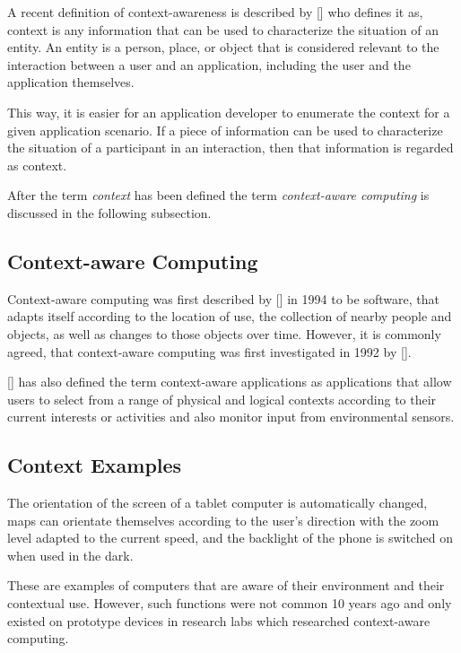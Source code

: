 A recent definition of context-awareness is described by [\citeauthor{Dey2000b}] who defines it as, context is any information that can be used to characterize the situation of an entity. An entity is a person, place, or object that is considered relevant to the interaction between a user and an application, including the user and the application themselves. 

This way, it is easier for an application developer to enumerate the context for a given application scenario. If a piece of information can be used to characterize the situation of a participant in an interaction, then that information is regarded as context.

After the term \textit{context} has been defined the term \textit{context-aware computing} is discussed in the following subsection.

\subsection{Context-aware Computing}
Context-aware computing was first described by [\citeauthor{ieee313011}] in 1994 to be software, that adapts itself according to the location of use, the collection of nearby people and objects, as well as changes to those objects over time. However, it is commonly agreed, that context-aware computing was first investigated in 1992 by [\citeauthor{WantHFG92}]. 

[\citeauthor{RyanME}] has also defined the term context-aware applications as applications that allow users to select from a range of physical and logical contexts according to their current interests or activities and also monitor input from environmental sensors.

\subsection{Context Examples}
The orientation of the screen of a tablet computer is automatically changed, maps can orientate themselves according to the user's direction with the zoom level adapted to the current speed, and the backlight of the phone is switched on when used in the dark.

These are examples of computers that are aware of their environment and their contextual use. However, such functions were not common 10 years ago and only existed on prototype devices in research labs which researched context-aware computing.
\\

